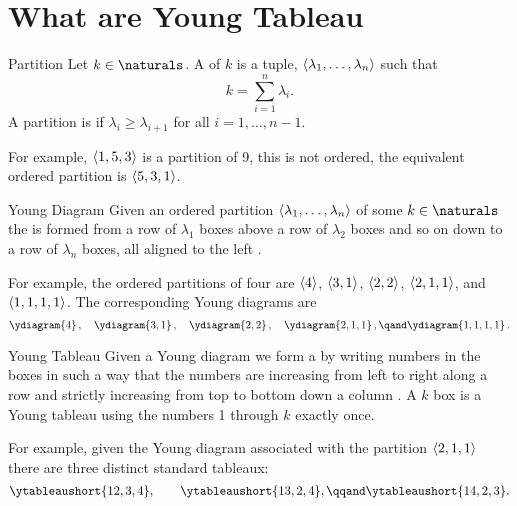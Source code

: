 \documentclass[fleqn]{NotesClass}
\DeclarePairedDelimiter{\tuple}{\langle}{\rangle}
\begin{document}
    \section{What are Young Tableau}
    \begin{dfn}{Partition}{}
        Let \(k \in \naturals\).
        A  of \(k\) is a tuple, \(\tuple{\lambda_1, \dotsc, \lambda_n}\) such that \cite[720]{hassani}
        \begin{equation}
            k = \sum_{i = 1}^{n} \lambda_i.
        \end{equation}
        A partition is  if \(\lambda_i \ge \lambda_{i+1}\) for all \(i = 1, \dotsc, n - 1\).
    \end{dfn}

    For example, \(\tuple{1,5,3}\) is a partition of 9, this is not ordered, the equivalent ordered partition is \(\tuple{5,3,1}\).
    
    \begin{dfn}{Young Diagram}{}
        Given an ordered partition \(\tuple{\lambda_1, \dotsc, \lambda_n}\) of some \(k \in \naturals\) the  is formed from a row of \(\lambda_1\) boxes above a row of \(\lambda_2\) boxes and so on down to a row of \(\lambda_n\) boxes, all aligned to the left \cite[87]{cvitanovic}.
    \end{dfn}
    
    For example, the ordered partitions of four are \(\tuple{4}\), \(\tuple{3,1}\), \(\tuple{2,2}\), \(\tuple{2,1,1}\), and \(\tuple{1,1,1,1}\).
    The corresponding Young diagrams are
    \begin{equation}
        \ydiagram{4}\,, \quad \ydiagram{3,1}\,, \quad \ydiagram{2,2}\,, \quad \ydiagram{2,1,1}\,, \qand \ydiagram{1,1,1,1}\,.
    \end{equation}
    
    \begin{dfn}{Young Tableau}{}
        Given a Young diagram we form a  by writing numbers in the boxes in such a way that the numbers are increasing from left to right along a row and strictly increasing from top to bottom down a column \cite{cvitanovic}.
        A \(k\) box  is a Young tableau using the numbers 1 through \(k\) exactly once.
    \end{dfn}
    
    For example, given the Young diagram associated with the partition \(\tuple{2,1,1}\) there are three distinct standard tableaux:
    \begin{equation}
        \ytableaushort{12,3,4}, \qquad \ytableaushort{13,2,4}, \qqand \ytableaushort{14,2,3}.
    \end{equation}
    
\end{document}
